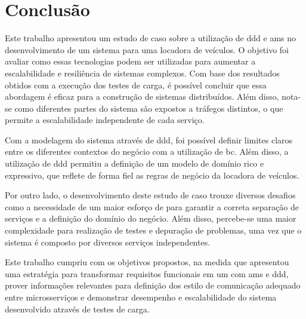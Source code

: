 \chapter{Conclusão}
\label{cap:conclusão}

Este trabalho apresentou um estudo de caso sobre a utilização de \acrfull{ddd} e \acrfull{ams} no desenvolvimento de um sistema para uma locadora de veículos. O objetivo foi avaliar como essas tecnologias podem ser utilizadas para aumentar a escalabilidade e resiliência de sistemas complexos. Com base dos resultados obtidos com a execução dos testes de carga, é possível concluir que essa abordagem é eficaz para a construção de sistemas distribuídos. Além disso, nota-se como diferentes partes do sistema são expostos a tráfegos distintos, o que permite a escalabilidade independente de cada serviço.

Com a modelagem do sistema através de \acrshort{ddd}, foi possível definir limites claros entre os diferentes contextos do negócio com a utilização de \acrfull{bc}. Além disso, a utilização de \acrshort{ddd} permitiu a definição de um modelo de domínio rico e expressivo, que reflete de forma fiel as regras de negócio da locadora de veículos.

Por outro lado, o desenvolvimento deste estudo de caso trouxe diversos desafios como a necessidade de um maior esforço de  para garantir a correta separação de serviços e a definição do domínio do negócio. Além disso, percebe-se uma maior complexidade para realização de testes e depuração de problemas, uma vez que o sistema é composto por diversos serviços independentes.

Este trabalho cumpriu com os objetivos propostos, na medida que apresentou uma estratégia para transformar requisitos funcionais em um  com \acrshort{ams} e \acrshort{ddd}, prover informações relevantes para definição dos estilo de comunicação adequado entre microsserviços e demonstrar desempenho e escalabilidade do sistema desenvolvido através de testes de carga.

